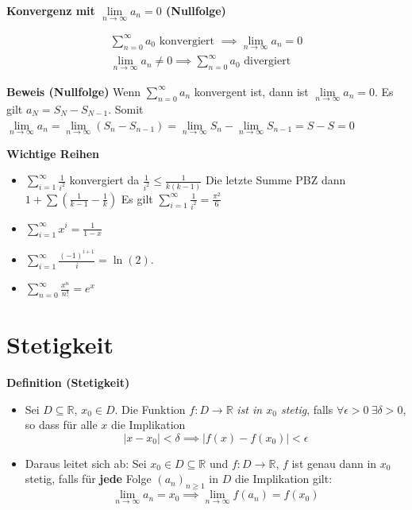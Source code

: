 \documentclass[25pt]{sciposter}
\newcommand{\limm}{\lim\limits_{n \to \infty}}
\newcommand{\R}{\mathbb{R}}
\newenvironment{method}[1]{\begin{mdframed}[backgroundcolor=blue!10,innertopmargin=15pt, innerbottommargin=15pt, nobreak=true]
		\textbf{#1 }
	}
	{ 
	\end{mdframed}
}
\newenvironment{important}{\begin{mdframed}[backgroundcolor=red!50,innertopmargin=15pt, innerbottommargin=15pt, nobreak=true]
		\Large
	}
	{ 
	\end{mdframed}
}
\begin{document}
\begin{multicols}{3}
\begin{method}{Konvergenz mit $\lim\limits_{n \to \infty } a_n = 0$ (Nullfolge)}
\begin{align*}
\sum_{n=0}^{\infty} a_0 \text{ konvergiert } \implies \lim\limits_{n \to \infty } a_n = 0\\
\lim\limits_{n \to \infty } a_n \not = 0 \implies \sum_{n=0}^{\infty} a_0 \text{ divergiert }
\end{align*}
\end{method}

\textbf{Beweis (Nullfolge)} Wenn $\sum_{n = 0}^{\infty} a_n$ konvergent ist, dann ist $\limm a_n = 0$.
Es gilt $a_N = S_N - S_{N-1}$. Somit $\limm a_n = \limm (S_n - S_{n-1}) = \limm S_n - \limm S_{n-1} = S-S = 0$

\begin{important}{
	\small \textbf{Wichtige Reihen}
	\begin{itemize}
		\item $\sum_{i=1}^{\infty} \frac{1}{i^2}$ konvergiert da $\frac{1}{i^2} \leq \frac{1}{k(k-1)}$ Die letzte Summe PBZ dann $1 + \sum \left( \frac{1}{k-1} - \frac{1}{k}\right)$ Es gilt $\sum_{i=1}^{\infty} \frac{1}{i^2} = \frac{\pi^2}{6}$
		\item $\sum_{i=1}^{\infty} x^i = \frac{1}{1-x}$
		\item $\sum_{i=1}^{\infty} \frac{(-1)^{i+1}}{i} = \ln(2)$.
		\item $\sum_{n=0}^{\infty} \frac{x^n}{n!} = e^x$
	\end{itemize}
}\end{important}



\vfill\null
\columnbreak








\section{Stetigkeit}
\begin{method}{Definition (Stetigkeit)}
	\begin{itemize}
		\item Sei $D \subseteq \mathbb{R}$, $x_0 \in D$. Die Funktion $f:D \to \R$ \textit{ist in $x_0$ stetig}, falls $\forall \epsilon > 0 \ \exists \delta > 0$, so dass für alle $x$ die Implikation $$|x-x_0| < \delta \implies |f(x) - f(x_0)| < \epsilon$$
		
		\item Daraus leitet sich ab: Sei $x_0 \in D \subseteq \R$ und $f:D \to \R$, $f$ ist genau dann in $x_0$ stetig, falls für \textbf{jede} Folge $(a_n)_{n \geq 1}$ in $D$ die Implikation gilt:$$\lim\limits_{n \to \infty} a_n = x_0 \implies \limm f(a_n) = f(x_0)$$
	\end{itemize}


\end{method}
\end{multicols}
\end{document}
